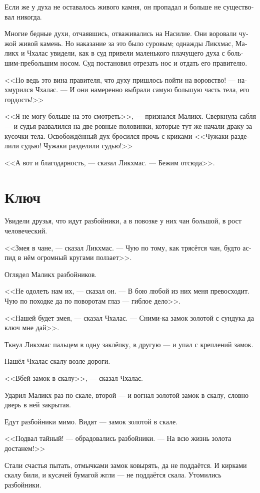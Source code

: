 \documentclass[a4paper,12pt,fleqn]{book}\usepackage{polyglossia}\setdefaultlanguage[babelshorthands=true]{russian}\setotherlanguage{english}\defaultfontfeatures{Ligatures=TeX,Mapping=tex-text}\usepackage{xcolor}\newcommand{\ml}[3]{#2}
\begin{document}
{Если же у духа не оставалось живого камня, он пропадал и больше не существовал никогда.

Многие бедные духи, отчаявшись, отваживались на Насилие.
Они воровали чужой живой камень.
Но наказание за это было суровым;
однажды Ликхмас, Маликх и Чхалас увидели, как в суд привели маленького плачущего духа с большим-пребольшим носом.
Суд постановил отрезать нос и отдать его правителю.

<<Но ведь это вина правителя, что духу пришлось пойти на воровство! --- нахмурился Чхалас.
--- И они намеренно выбрали самую большую часть тела, его гордость!>>

<<Я не могу больше на это смотреть>>, --- признался Маликх.
Сверкнула сабля --- и судья развалился на две ровные половинки, которые тут же начали драку за кусочки тела.
Освобождённый дух бросился прочь с криками <<Чужаки разделили судью! Чужаки разделили судью!>>

<<А вот и благодарность, --- сказал Ликхмас.
--- Бежим отсюда>>.

\section{Ключ}

Увидели друзья, что идут разбойники, а в повозке у них чан большой, в рост человеческий.

<<Змея в чане, --- сказал Ликхмас.
--- Чую по тому, как трясётся чан, будто аспид в нём огромный кругами ползает>>.

Оглядел Маликх разбойников.

<<Не одолеть нам их, --- сказал он.
--- В бою любой из них меня превосходит.
Чую по походке да по поворотам глаз --- гиблое дело>>.

<<Нашей будет змея, --- сказал Чхалас.
--- Сними-ка замок золотой с сундука да ключ мне дай>>.

Ткнул Ликхмас пальцем в одну заклёпку, в другую --- и упал с креплений замок.

Нашёл Чхалас скалу возле дороги.

<<Вбей замок в скалу>>, --- сказал Чхалас.

Ударил Маликх раз по скале, второй --- и вогнал золотой замок в скалу, словно дверь в ней закрытая.

Едут разбойники мимо.
Видят --- замок золотой в скале.

<<Подвал тайный! --- обрадовались разбойники.
--- На всю жизнь золота достанем!>>

Стали счастья пытать, отмычками замок ковырять, да не поддаётся.
И кирками скалу били, и кусачей бумагой жгли --- не поддаётся скала.
Утомились разбойники.

}
\end{document}
